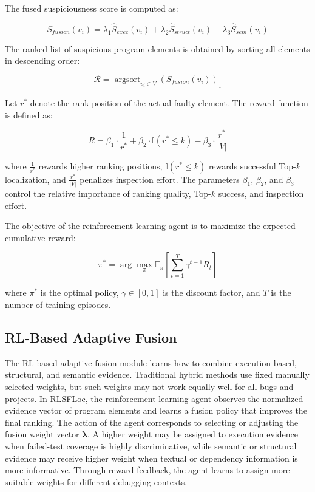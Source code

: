 \documentclass[article,article,submit,pdftex,moreauthors]{Definitions/mdpi}
\begin{document}
The fused suspiciousness score is computed as:

\begin{equation}
S_{fusion}(v_i)=
\lambda_1\hat{S}_{exec}(v_i)
+
\lambda_2\hat{S}_{struct}(v_i)
+
\lambda_3\hat{S}_{sem}(v_i)
\end{equation}

The ranked list of suspicious program elements is obtained by sorting all elements in descending order:

\begin{equation}
\mathcal{R}
=
\operatorname{argsort}_{v_i \in V}
\left(S_{fusion}(v_i)\right)_{\downarrow}
\end{equation}

Let $r^*$ denote the rank position of the actual faulty element. The reward function is defined as:

\begin{equation}
R=
\beta_1 \cdot \frac{1}{r^*}
+
\beta_2 \cdot \mathbb{I}(r^* \leq k)
-
\beta_3 \cdot \frac{r^*}{|V|}
\end{equation}

where $\frac{1}{r^*}$ rewards higher ranking positions, $\mathbb{I}(r^* \leq k)$ rewards successful Top-$k$ localization, and $\frac{r^*}{|V|}$ penalizes inspection effort. The parameters $\beta_1$, $\beta_2$, and $\beta_3$ control the relative importance of ranking quality, Top-$k$ success, and inspection effort.

The objective of the reinforcement learning agent is to maximize the expected cumulative reward:

\begin{equation}
\pi^* =
\arg\max_{\pi}
\mathbb{E}_{\pi}
\left[
\sum_{t=1}^{T}
\gamma^{t-1}R_t
\right]
\end{equation}

where $\pi^*$ is the optimal policy, $\gamma \in [0,1]$ is the discount factor, and $T$ is the number of training episodes.

\subsection{RL-Based Adaptive Fusion}

The RL-based adaptive fusion module learns how to combine execution-based, structural, and semantic evidence. Traditional hybrid methods use fixed manually selected weights, but such weights may not work equally well for all bugs and projects. In RLSFLoc, the reinforcement learning agent observes the normalized evidence vector of program elements and learns a fusion policy that improves the final ranking. The action of the agent corresponds to selecting or adjusting the fusion weight vector $\boldsymbol{\lambda}$. A higher weight may be assigned to execution evidence when failed-test coverage is highly discriminative, while semantic or structural evidence may receive higher weight when textual or dependency information is more informative. Through reward feedback, the agent learns to assign more suitable weights for different debugging contexts.
\end{document}
